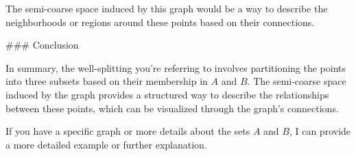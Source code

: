 The semi-coarse space induced by this graph would be a way to describe the neighborhoods or regions around these points based on their connections.

### Conclusion

In summary, the well-splitting you're referring to involves partitioning the points into three subsets based on their membership in \( A \) and \( B \). The semi-coarse space induced by the graph provides a structured way to describe the relationships between these points, which can be visualized through the graph's connections.

If you have a specific graph or more details about the sets \( A \) and \( B \), I can provide a more detailed example or further explanation.